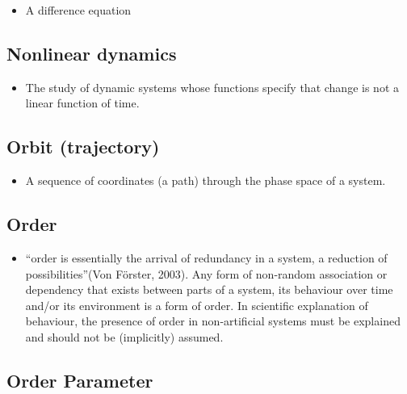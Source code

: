 \documentclass[12pt,]{book}
\providecommand{\tightlist}{%
  \setlength{\itemsep}{0pt}\setlength{\parskip}{0pt}}
\begin{document}
\begin{itemize}
\tightlist
\item
  A difference equation
\end{itemize}

\hypertarget{Nonl49}{%
\subsection*{\texorpdfstring{\textbf{Nonlinear dynamics}}{Nonlinear dynamics}}\label{Nonl49}}

\begin{itemize}
\tightlist
\item
  The study of dynamic systems whose functions specify that change is not a linear function of time.
\end{itemize}

\hypertarget{Orbi50}{%
\subsection*{\texorpdfstring{\textbf{Orbit (trajectory)}}{Orbit (trajectory)}}\label{Orbi50}}

\begin{itemize}
\tightlist
\item
  A sequence of coordinates (a path) through the phase space of a system.
\end{itemize}

\hypertarget{Orde51}{%
\subsection*{\texorpdfstring{\textbf{Order}}{Order}}\label{Orde51}}

\begin{itemize}
\tightlist
\item
  ``order is essentially the arrival of redundancy in a system, a reduction of possibilities''(Von Förster, 2003). Any form of non-random association or dependency that exists between parts of a system, its behaviour over time and/or its environment is a form of order. In scientific explanation of behaviour, the presence of order in non-artificial systems must be explained and should not be (implicitly) assumed.
\end{itemize}

\hypertarget{Orde52}{%
\subsection*{\texorpdfstring{\textbf{Order Parameter}}{Order Parameter}}\label{Orde52}}
\end{document}
